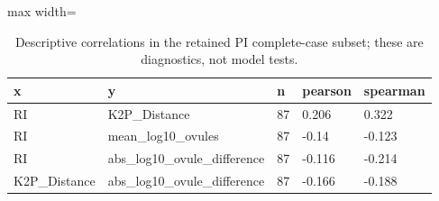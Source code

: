 \begin{table}
\caption{Descriptive correlations in the retained PI complete-case subset; these are diagnostics, not model tests.}
\label{tab:correlations}
\begin{adjustbox}{max width=\textwidth}
\begin{tabular}{lllll}
\toprule
x & y & n & pearson & spearman \\
\midrule
RI & K2P\_Distance & 87 & 0.206 & 0.322 \\
RI & mean\_log10\_ovules & 87 & -0.14 & -0.123 \\
RI & abs\_log10\_ovule\_difference & 87 & -0.116 & -0.214 \\
K2P\_Distance & abs\_log10\_ovule\_difference & 87 & -0.166 & -0.188 \\
\bottomrule
\end{tabular}
\end{adjustbox}
\end{table}
